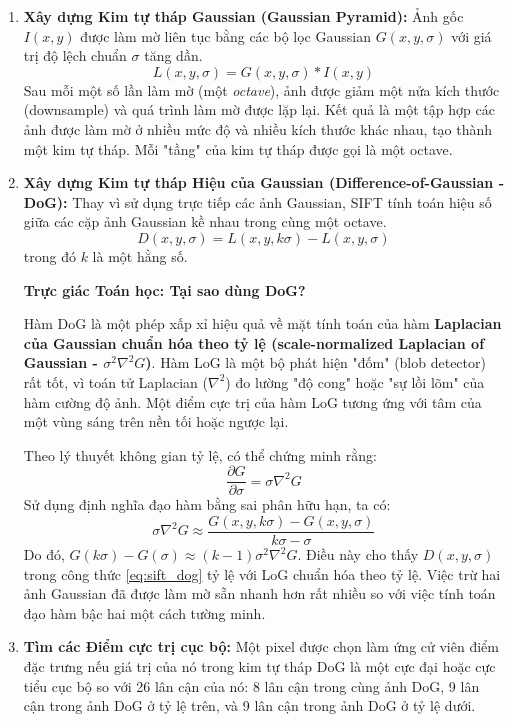 \begin{enumerate}
    \item \textbf{Xây dựng Kim tự tháp Gaussian (Gaussian Pyramid):} Ảnh gốc $I(x, y)$ được làm mờ liên tục bằng các bộ lọc Gaussian $G(x, y, \sigma)$ với giá trị độ lệch chuẩn $\sigma$ tăng dần.
    \begin{equation}
        L(x, y, \sigma) = G(x, y, \sigma) * I(x, y)
    \end{equation}
    Sau mỗi một số lần làm mờ (một \textit{octave}), ảnh được giảm một nửa kích thước (downsample) và quá trình làm mờ được lặp lại. Kết quả là một tập hợp các ảnh được làm mờ ở nhiều mức độ và nhiều kích thước khác nhau, tạo thành một kim tự tháp. Mỗi "tầng" của kim tự tháp được gọi là một octave.

    \item \textbf{Xây dựng Kim tự tháp Hiệu của Gaussian (Difference-of-Gaussian - DoG):} Thay vì sử dụng trực tiếp các ảnh Gaussian, SIFT tính toán hiệu số giữa các cặp ảnh Gaussian kề nhau trong cùng một octave.
    \begin{equation}
        D(x, y, \sigma) = L(x, y, k\sigma) - L(x, y, \sigma)
        \label{eq:sift_dog}
    \end{equation}
    trong đó $k$ là một hằng số.

    \begin{mdframed}[style=infobox]
    \textbf{Trực giác Toán học: Tại sao dùng DoG?}
    
    Hàm DoG là một phép xấp xỉ hiệu quả về mặt tính toán của hàm \textbf{Laplacian của Gaussian chuẩn hóa theo tỷ lệ (scale-normalized Laplacian of Gaussian - $\sigma^2 \nabla^2 G$)}. Hàm LoG là một bộ phát hiện "đốm" (blob detector) rất tốt, vì toán tử Laplacian ($\nabla^2$) đo lường "độ cong" hoặc "sự lồi lõm" của hàm cường độ ảnh. Một điểm cực trị của hàm LoG tương ứng với tâm của một vùng sáng trên nền tối hoặc ngược lại.
    
    Theo lý thuyết không gian tỷ lệ, có thể chứng minh rằng:
    \begin{equation}
        \frac{\partial G}{\partial \sigma} = \sigma \nabla^2 G
    \end{equation}
    Sử dụng định nghĩa đạo hàm bằng sai phân hữu hạn, ta có:
    \begin{equation}
        \sigma \nabla^2 G \approx \frac{G(x, y, k\sigma) - G(x, y, \sigma)}{k\sigma - \sigma}
    \end{equation}
    Do đó, $G(k\sigma) - G(\sigma) \approx (k-1)\sigma^2 \nabla^2 G$. Điều này cho thấy $D(x,y,\sigma)$ trong công thức \ref{eq:sift_dog} tỷ lệ với LoG chuẩn hóa theo tỷ lệ. Việc trừ hai ảnh Gaussian đã được làm mờ sẵn nhanh hơn rất nhiều so với việc tính toán đạo hàm bậc hai một cách tường minh.
    \end{mdframed}

    \item \textbf{Tìm các Điểm cực trị cục bộ:} Một pixel được chọn làm ứng cử viên điểm đặc trưng nếu giá trị của nó trong kim tự tháp DoG là một cực đại hoặc cực tiểu cục bộ so với 26 lân cận của nó: 8 lân cận trong cùng ảnh DoG, 9 lân cận trong ảnh DoG ở tỷ lệ trên, và 9 lân cận trong ảnh DoG ở tỷ lệ dưới.
\end{enumerate}

